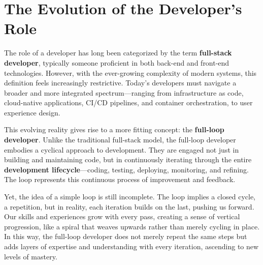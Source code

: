 \documentclass[../../main.tex]{subfiles}
\begin{document}
    \section{The Evolution of the Developer's Role}

        The role of a developer has long been categorized by the term \textbf{full-stack developer}, typically someone proficient in both back-end and front-end technologies. However, with the ever-growing complexity of modern systems, this definition feels increasingly restrictive. Today's developers must navigate a broader and more integrated spectrum—ranging from infrastructure as code, cloud-native applications, CI/CD pipelines, and container orchestration, to user experience design.

        This evolving reality gives rise to a more fitting concept: the \textbf{full-loop developer}. Unlike the traditional full-stack model, the full-loop developer embodies a cyclical approach to development. They are engaged not just in building and maintaining code, but in continuously iterating through the entire \textbf{development lifecycle}—coding, testing, deploying, monitoring, and refining. The loop represents this continuous process of improvement and feedback.

        Yet, the idea of a simple loop is still incomplete. The loop implies a closed cycle, a repetition, but in reality, each iteration builds on the last, pushing us forward. Our skills and experiences grow with every pass, creating a sense of vertical progression, like a spiral that weaves upwards rather than merely cycling in place. In this way, the full-loop developer does not merely repeat the same steps but adds layers of expertise and understanding with every iteration, ascending to new levels of mastery.

\end{document}
